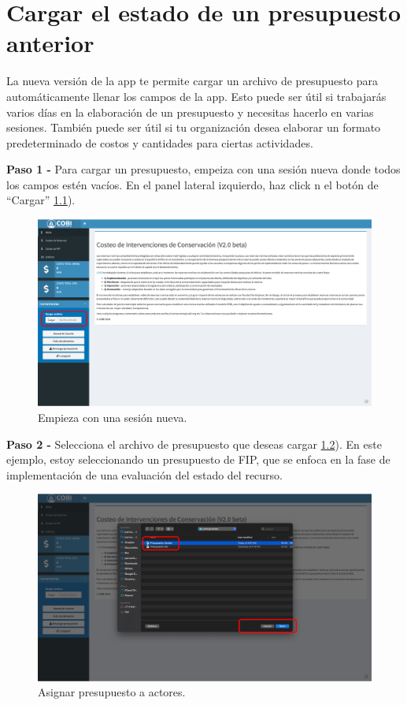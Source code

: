 \documentclass[
]{book}
\begin{document}
\hypertarget{cargar}{%
\chapter{Cargar el estado de un presupuesto anterior}\label{cargar}}

La nueva versión de la app te permite cargar un archivo de presupuesto para automáticamente llenar los campos de la app. Esto puede ser útil si trabajarás varios días en la elaboración de un presupuesto y necesitas hacerlo en varias sesiones. También puede ser útil si tu organización desea elaborar un formato predeterminado de costos y cantidades para ciertas actividades.

\textbf{Paso 1 - } Para cargar un presupuesto, empeiza con una sesión nueva donde todos los campos estén vacíos. En el panel lateral izquierdo, haz click n el botón de ``Cargar'' \ref{fig:up-1}).

\begin{figure}
\centering
\includegraphics{images/up-1.png}
\caption{\label{fig:up-1}Empieza con una sesión nueva.}
\end{figure}

\textbf{Paso 2 - } Selecciona el archivo de presupuesto que deseas cargar \ref{fig:up-2}). En este ejemplo, estoy seleccionando un presupuesto de FIP, que se enfoca en la fase de implementación de una evaluación del estado del recurso.

\begin{figure}
\centering
\includegraphics{images/up-2.png}
\caption{\label{fig:up-2}Asignar presupuesto a actores.}
\end{figure}
\end{document}
